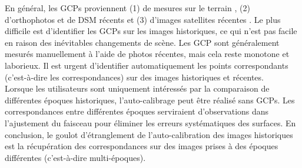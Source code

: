 En général, les \ac{GCP}s proviennent (1) de mesures sur le terrain \cite{micheletti2015application,walstra2004time,cardenal2006use}, (2) d'orthophotos et de \ac{DSM} récents \cite{nurminen2015automation,ellis2006measuring,fox2008unlocking} et (3) d'images satellites récentes \cite{ellis2006measuring,ford2013shoreline}. Le plus difficile est d'identifier les \ac{GCP}s sur les images historiques, ce qui n'est pas facile en raison des inévitables changements de scène. Les \ac{GCP} sont généralement mesurés manuellement à l'aide de photos récentes, mais cela reste monotone et laborieux. 
Il est urgent d'identifier automatiquement les points correspondants (c'est-à-dire les correspondances) sur des images historiques et récentes.\\
Lorsque les utilisateurs sont uniquement intéressés par la comparaison de différentes époques historiques, l'auto-calibrage peut être réalisé sans \ac{GCP}s. Les correspondances entre différentes époques serviraient d'observations dans l'ajustement du faisceau pour éliminer les erreurs systématiques des surfaces. En conclusion, le goulot d'étranglement de l'auto-calibration des images historiques est la récupération des correspondances sur des images prises à des époques différentes (c'est-à-dire multi-époques).



